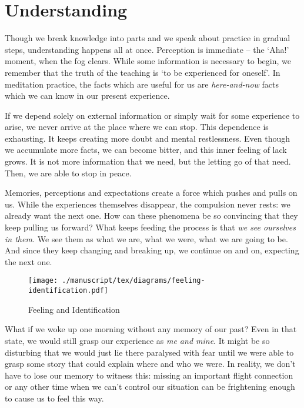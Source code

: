 \chapter{Understanding}


Though we break knowledge into parts and we speak about practice in
gradual steps, understanding happens all at once. Perception is
immediate -- the `Aha!' moment, when the fog clears. While some
information is necessary to begin, we remember that the truth of the
teaching is `to be experienced for oneself'. In meditation practice, the
facts which are useful for us are \emph{here-and-now} facts which we can
know in our present experience.

If we depend solely on external information or simply wait for some
experience to arise, we never arrive at the place where we can stop.
This dependence is exhausting. It keeps creating more doubt and mental
restlessness. Even though we accumulate more facts, we can become
bitter, and this inner feeling of lack grows. It is not more information
that we need, but the letting go of that need. Then, we are able to stop
in peace.


Memories, perceptions and expectations create a force which pushes and
pulls on us. While the experiences themselves disappear, the compulsion
never rests: we already want the next one. How can these phenomena be so
convincing that they keep pulling us forward? What keeps feeding the
process is that \emph{we see ourselves in them.} We see them as what we
are, what we were, what we are going to be. And since they keep changing
and breaking up, we continue on and on, expecting the next one.

\clearpage
\figurepagelayout

\begin{figure}[h]
\caption{Feeling and Identification}\label{fig-feeling-identification}
\bigskip
\texttt{[image: ./manuscript/tex/diagrams/feeling-identification.pdf]}
\end{figure}

\clearpage
\normalpagelayout

What if we woke up one morning without any memory of our past? Even in
that state, we would still grasp our experience as \emph{me and mine}.
It might be so disturbing that we would just lie there paralysed with
fear until we were able to grasp some story that could explain where and
who we were. In reality, we don't have to lose our memory to witness
this: missing an important flight connection or any other time when we
can't control our situation can be frightening enough to cause us to
feel this way.


